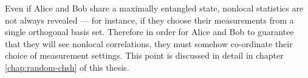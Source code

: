 Even if Alice and Bob share a maximally entangled state, nonlocal statistics are not always revealed --- for instance, if they choose their measurements from a single orthogonal basis set. 
Therefore in order for Alice and Bob to guarantee that they will see nonlocal correlations, they must somehow co-ordinate their choice of measurement settings. This point is discussed in detail in chapter \ref{chap:random-chsh} of this thesis.








